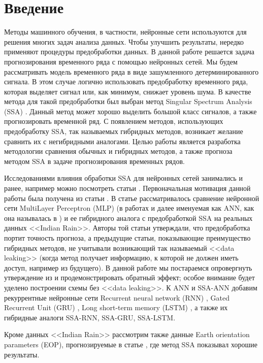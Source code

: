 \documentclass[specialist,
               substylefile = spbu.rtx,
               subf,href,colorlinks=true, 12p]{disser}
\begin{document}
\chapter*{Введение}
Методы машинного обучения, в частности, нейронные сети используются для решения многих задач анализа данных. Чтобы улучшить результаты, нередко применяют процедуры предобработки данных. В данной работе решается задача прогнозирования временного ряда с помощью нейронных сетей. 
Мы будем рассматривать модель временного ряда в виде зашумленного детерминированного сигнала. В этом случае логично использовать предобработку временного ряда, которая выделяет сигнал или, как минимум, снижает уровень шума. В качестве метода для такой предобработки был выбран метод Singular Spectrum Analysis (SSA) \cite{SSA}. Данный метод может хорошо выделить большой класс сигналов, а также прогнозировать временной ряд. С появлением методов, использующих предобработку SSA, так называемых гибридных методов, возникает желание сравнить их с негибридными аналогами. Целью работы является разработка методологии сравнения обычных и гибридных методов, а также прогноза методом SSA в задаче прогнозирования временных рядов.

Исследованиями влияния обработки SSA для нейронных сетей занимались и ранее, например можно посмотреть статьи \cite{wang2015daily, wu2010prediction, Wu2011}. Первоначальная мотивация данной работы была получена из статьи \cite{ar1}. В статье рассматривалось сравнение нейронной сети MultiLayer Perceptron (MLP) (в работах и далее именуемая как ANN, как она называлась в \cite{ar1}) и ее гибридного аналога с предобработкой SSA на реальных данных <<Indian Rain>>. Авторы той статьи утверждали, что предобработка портит точность прогноза, а предыдущие статьи, показывающие преимущество гибридных методов, не учитывали возникающий так называемый <<data leaking>> (когда метод получает информацию, к которой не должен иметь доступ, например из будущего). В данной работе мы постараемся опровергнуть утверждение из \cite{ar1} и продемонстрировать обратный эффект; особое внимание будет уделено построении схемы без <<data leaking>>. К ANN и SSA-ANN добавим рекуррентные нейронные сети Recurrent neural network (RNN) \cite{rnn}, Gated Recurrent Unit (GRU) \cite{gru}, Long short-term memory (LSTM) \cite{lstm}, а также их гибридные аналоги SSA-RNN, SSA-GRU, SSA-LSTM. 

Кроме данных <<Indian Rain>> рассмотрим также данные Earth \linebreak orientation parameters (EOP), прогнозируемые в статье \cite{eopart}, где метод SSA показывал хорошие результаты. 
\end{document}
